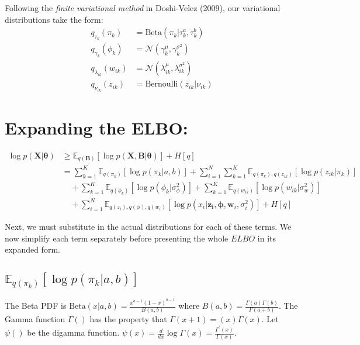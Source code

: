 \documentclass[11pt]{article}
\theoremstyle{definition}
\theoremstyle{plain}
\newcommand{\E}{\mathbb{E}}
\newcommand{\Beta}{\text{Beta}}
\newcommand{\Bernoulli}{\text{Bernoulli}}
\begin{document}
\noindent Following the \textit{finite variational method} in Doshi-Velez (2009), our variational distributions take the form:
\begin{align*}
    q_{\tau_k}(\pi_k) &= \Beta(\pi_k|\tau_k^a, \tau_k^b)\\
    q_{\gamma_k}(\phi_k) &= \mathcal{N}(\gamma_{k}^{\mu}, \gamma_{k}^{\sigma^2})\\
    q_{\lambda_{ik}}(w_{ik}) &= \mathcal{N}(\lambda_{ik}^{\mu}, \lambda_{ik}^{\sigma^2})\\
    q_{\nu_{ik}}(z_{ik}) &= \Bernoulli(z_{ik}|\nu_{ik})
\end{align*}

\section{Expanding the ELBO:}

\begin{align*}
    \log p (\mathbf{X}|\boldsymbol{\theta}) &\geq \E_{q(\mathbf{B})}[\log p(\mathbf{X,B} | \boldsymbol{\theta})] + H[q]\\
                                       &= \sum_{k=1}^K \E_{q(\pi_k)}[\log p(\pi_k|a,b)] 
    + \sum_{i=1}^N \sum_{k=1}^K \E_{q(\pi_k),q(z_{ik})}[\log p(z_{ik}|\pi_k)]\\
    &\quad + \sum_{k=1}^K \E_{q(\phi_k)}[\log p(\phi_k|\sigma^2_\phi)] + \sum_{k=1}^K \E_{q(w_{ik})}[ \log p(w_{ik}|\sigma^2_w)]\\
    &\quad + \sum_{i=1}^N \E_{q(z_i),q(\phi),q(w_i)}[\log p(x_i | \mathbf{z_i}, \boldsymbol{\phi}, \mathbf{w}_i, \sigma^2_i)] + H[q]
\end{align*}

\noindent Next, we must substitute in the actual distributions for each of these terms.
We now simplify each term separately before presenting the whole $ELBO$ in its expanded form.

\subsection{$\E_{q(\pi_k)}[\log p(\pi_k|a,b)]$}

\noindent The Beta PDF is $\Beta(x|a,b) = \frac{x^{a-1}(1-x)^{b-1}}{B(a,b)}$ 
where $B(a,b) = \frac{\Gamma(a)\Gamma(b)}{\Gamma(a+b)}$. The Gamma function $\Gamma()$
has the property that $\Gamma(x+1) =  (x)\Gamma(x)$. Let $\psi()$ be the digamma function.
$\psi(x) = \frac{d}{dx} \log \Gamma(x) = \frac{\Gamma^\prime(x)}{\Gamma(x)}$. 


%
\end{document}
